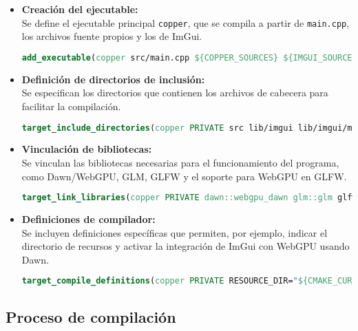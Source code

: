 \begin{itemize}
    \item \textbf{Creación del ejecutable:}\\
          Se define el ejecutable principal \texttt{copper}, que se compila a partir de \texttt{main.cpp}, los archivos fuente propios y los de ImGui.
          \begin{lstlisting}[language=CMake, caption={Creación del ejecutable en CMakeLists.txt}]
    add_executable(copper src/main.cpp ${COPPER_SOURCES} ${IMGUI_SOURCES})\end{lstlisting}

    \item \textbf{Definición de directorios de inclusión:}\\
          Se especifican los directorios que contienen los archivos de cabecera para facilitar la compilación.
          \begin{lstlisting}[language=CMake, caption={Definición de directorios de inclusión en CMakeLists.txt}]
    target_include_directories(copper PRIVATE src lib/imgui lib/imgui/misc/cpp lib/imgui/backends ${CMAKE_CURRENT_BINARY_DIR}/src)\end{lstlisting}

    \item \textbf{Vinculación de bibliotecas:}\\
          Se vinculan las bibliotecas necesarias para el funcionamiento del programa, como Dawn/WebGPU, GLM, GLFW y el soporte para WebGPU en GLFW.
          \begin{lstlisting}[language=CMake, caption={Vinculación de bibliotecas en CMakeLists.txt}]
    target_link_libraries(copper PRIVATE dawn::webgpu_dawn glm::glm glfw webgpu_glfw ImGuiFileDialog)\end{lstlisting}

    \item \textbf{Definiciones de compilador:}\\
          Se incluyen definiciones específicas que permiten, por ejemplo, indicar el directorio de recursos y activar la integración de ImGui con WebGPU usando Dawn.
          \begin{lstlisting}[language=CMake, caption={Definiciones de compilador en CMakeLists.txt}]
                target_compile_definitions(copper PRIVATE RESOURCE_DIR="${CMAKE_CURRENT_SOURCE_DIR}/src" IMGUI_IMPL_WEBGPU_BACKEND_DAWN)
\end{lstlisting}
\end{itemize}

\subsection{Proceso de compilación}

